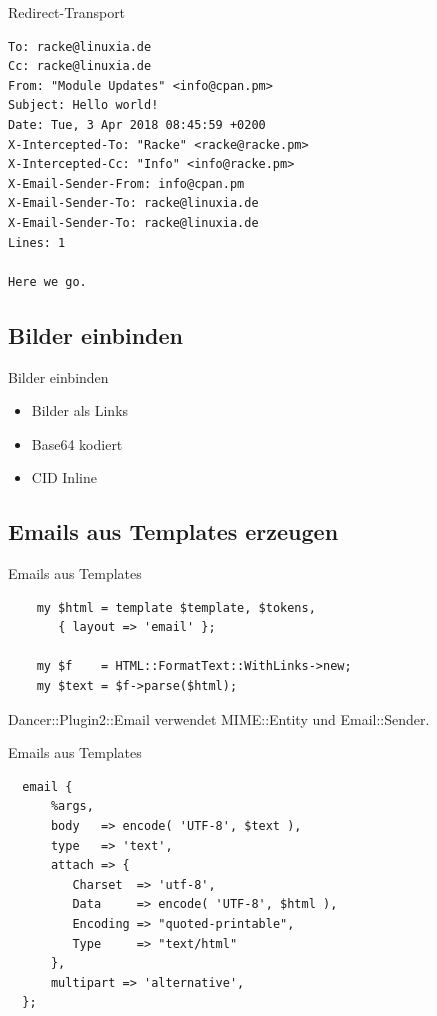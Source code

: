 \begin{frame}[fragile]{Redirect-Transport}
\begin{lstlisting}
To: racke@linuxia.de
Cc: racke@linuxia.de
From: "Module Updates" <info@cpan.pm>
Subject: Hello world!
Date: Tue, 3 Apr 2018 08:45:59 +0200
X-Intercepted-To: "Racke" <racke@racke.pm>
X-Intercepted-Cc: "Info" <info@racke.pm>
X-Email-Sender-From: info@cpan.pm
X-Email-Sender-To: racke@linuxia.de
X-Email-Sender-To: racke@linuxia.de
Lines: 1

Here we go.
\end{lstlisting}
\end{frame}

\subsection{Bilder einbinden}

\begin{frame}{Bilder einbinden}
  \begin{itemize}
  \item Bilder als Links
  \item Base64 kodiert
  \item CID Inline
  \end{itemize}
\end{frame}


\subsection{Emails aus Templates erzeugen}

\begin{frame}[fragile]{Emails aus Templates}
  \begin{verbatim}
    my $html = template $template, $tokens,
       { layout => 'email' };

    my $f    = HTML::FormatText::WithLinks->new;
    my $text = $f->parse($html);
  \end{verbatim}
\end{frame}

Dancer::Plugin2::Email verwendet MIME::Entity und Email::Sender.

\begin{frame}[fragile]{Emails aus Templates}
\begin{verbatim}
  email {
      %args,
      body   => encode( 'UTF-8', $text ),
      type   => 'text',
      attach => {
         Charset  => 'utf-8',
         Data     => encode( 'UTF-8', $html ),
         Encoding => "quoted-printable",
         Type     => "text/html"
      },
      multipart => 'alternative',
  };
\end{verbatim}
\end{frame}

